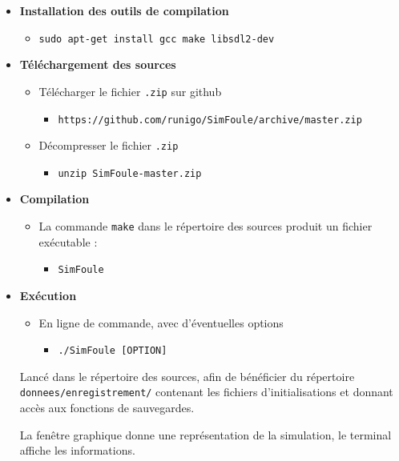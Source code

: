 \begin{itemize}[leftmargin=1cm, label=, itemsep=0pt]%
\item {\bf Installation des outils de compilation}
	\begin{itemize}[leftmargin=1cm, label=, itemsep=0pt]
	\item \texttt{sudo apt-get install gcc make libsdl2-dev}
	\end{itemize}
\item {\bf Téléchargement des sources}
	\begin{itemize}[leftmargin=1cm, label=, itemsep=0pt]
	\item Télécharger le fichier \texttt{.zip} sur github
		\begin{itemize}[leftmargin=1cm, label=, itemsep=0pt]
		\item \texttt{https://github.com/runigo/SimFoule/archive/master.zip}
		\end{itemize}
	\item Décompresser le fichier \texttt{.zip}
		\begin{itemize}[leftmargin=1cm, label=, itemsep=0pt]
		\item \texttt{unzip SimFoule-master.zip}
		\end{itemize}
	\end{itemize}
\item {\bf Compilation}
	\begin{itemize}[leftmargin=1cm, label=, itemsep=0pt]
	\item La commande \texttt{make} dans le répertoire des sources produit un fichier exécutable :
		\begin{itemize}[leftmargin=1cm, label=, itemsep=0pt]
		\item \texttt{SimFoule}
		\end{itemize}
	\end{itemize}

\item {\bf Exécution}
	\begin{itemize}[leftmargin=1cm, label=, itemsep=0pt]
	\item En ligne de commande, avec d'éventuelles options
		\begin{itemize}[leftmargin=1cm, label=, itemsep=0pt]
		\item \texttt{./SimFoule [OPTION]}
		\end{itemize}
	\end{itemize}

Lancé dans le répertoire des sources, afin de bénéficier du répertoire \texttt{donnees/enregistrement/} contenant les fichiers d'initialisations et donnant accès aux fonctions de sauvegardes.


La fenêtre graphique donne une représentation de la simulation, le terminal affiche les informations.
\end{itemize}




